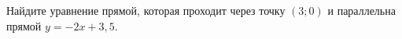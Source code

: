 \begin{ex}
	\begin{condition}
		Найдите уравнение прямой, которая проходит через точку \( (3;0) \) и параллельна прямой \( y=-2x+3,5 \).
	\end{condition}
\end{ex}